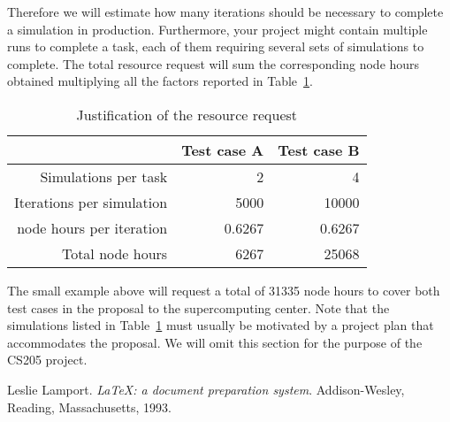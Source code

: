 \documentclass[11pt]{article}
\begin{document}
  Therefore we will estimate how many iterations should be necessary to
  complete a simulation in production. Furthermore, your project might contain
  multiple runs to complete a task, each of them requiring several sets of
  simulations to complete.  The total resource request will sum the
  corresponding node hours obtained multiplying all the factors reported in
  Table~\ref{table:resource_request}. 
  \begin{table}[H]
    \begin{center}
      \begin{tabular}{@{}*3{r}@{}}
        \hline \hline
        & Test case A & Test case B \\
        \hline \hline
        Simulations per task & 2 & 4 \\
        Iterations per simulation & 5000 & 10000 \\
        node hours per iteration & 0.6267 & 0.6267 \\
        Total node hours & 6267 & 25068 \\
        \hline \hline
      \end{tabular}
    \end{center}
    \caption{Justification of the resource request}
    \label{table:resource_request}
  \end{table}
  The small example above will request a total of 31335 node hours to cover
  both test cases in the proposal to the supercomputing center.  Note that the
  simulations listed in 
  Table~\ref{table:resource_request} must usually be motivated by a project
  plan that accommodates the proposal.  We will omit this section for the
  purpose of the CS205 project.


  \begin{thebibliography}{9}
      Leslie Lamport. 
      \textit{\LaTeX{}: a document preparation system}.
      Addison-Wesley, Reading, Massachusetts, 1993.
  \end{thebibliography}

\end{document}
